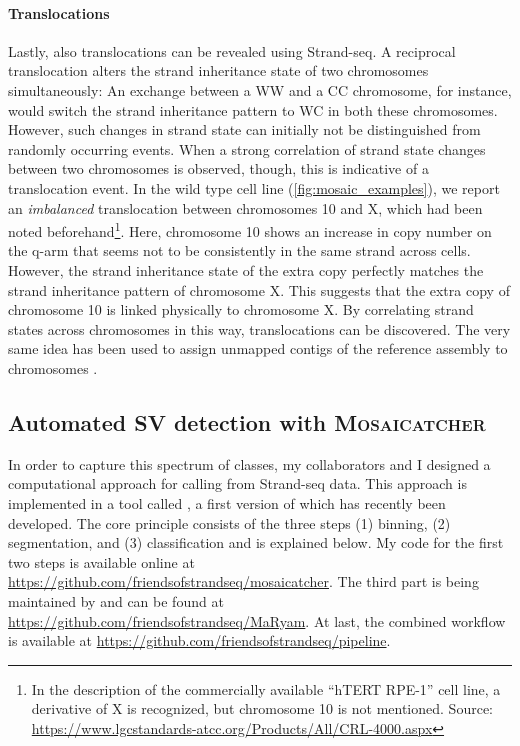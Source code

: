 \paragraph{Translocations}
Lastly, also translocations can be revealed using Strand-seq.  A reciprocal
translocation alters the strand inheritance state of two chromosomes
simultaneously: An exchange between a WW and a CC chromosome, for instance, would switch the
strand inheritance pattern to WC in both these chromosomes. However, such
changes in strand state can initially not be distinguished from randomly
occurring \sce events. When a strong correlation of strand state changes
between two chromosomes is observed, though, this is indicative of a
translocation event. In the  wild
type cell line (\cref{fig:mosaic_examples}), we report an \emph{imbalanced}
translocation between chromosomes 10 and X, which had been noted
beforehand\footnote{In the description of the commercially available
    ``hTERT RPE-1'' cell line, a derivative of X is recognized, but chromosome
    10 is not mentioned. Source: \url{https://www.lgcstandards-atcc.org/Products/All/CRL-4000.aspx}}.
Here, chromosome 10 shows an increase in copy number on the q-arm that seems not
to be consistently in the same strand across cells. However, the strand
inheritance state of the extra copy perfectly matches the strand inheritance
pattern of chromosome X. This suggests that the extra copy of chromosome 10 is
linked physically to chromosome X. By correlating strand states across
chromosomes in this way, translocations can be discovered. The very same idea
has been used to assign unmapped contigs of the reference assembly to
chromosomes \citep{Hills2013}.







\FloatBarrier
\subsection{Automated SV detection with \textsc{Mosaicatcher}}
\label{sec:mosaic_method}

In order to capture this spectrum of \sv classes, my collaborators and I
designed a computational approach for \sv calling from Strand-seq data.
This approach is implemented in a tool called \mc, a first version of which has recently been
developed. The core principle consists of the three steps (1) binning, (2)
segmentation, and (3) classification and is explained below. My code for the
first two steps is available online at
\url{https://github.com/friendsofstrandseq/mosaicatcher}.
The third part is being maintained by \maryam and can be found at
\url{https://github.com/friendsofstrandseq/MaRyam}. At last, the combined
workflow is available at \url{https://github.com/friendsofstrandseq/pipeline}.

